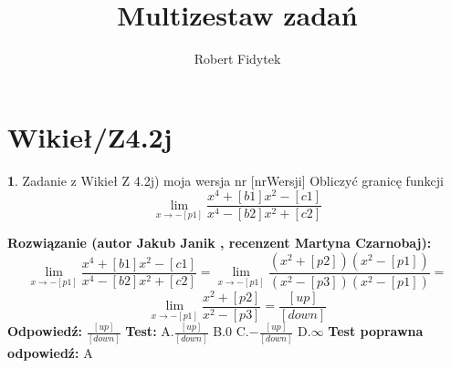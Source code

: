 \documentclass[12pt, a4paper]{article}
\title{Multizestaw zadań}
\author{Robert Fidytek}
\date{}
\theoremstyle{definition} %
\newtheorem{zad}{}
\newcommand{\kategoria}[1]{\section{#1}} %
\newcommand{\zadStart}[1]{\begin{zad}#1\newline} %
\newcommand{\zadStop}{\end{zad}}   %
\newcommand{\rozwStart}[2]{\noindent \textbf{Rozwiązanie (autor #1 , recenzent #2): }\newline} %
\newcommand{\rozwStop}{\newline}                                            %
\newcommand{\odpStart}{\noindent \textbf{Odpowiedź:}\newline}    %
\newcommand{\odpStop}{\newline}                                             %
\newcommand{\testStart}{\noindent \textbf{Test:}\newline} %
\newcommand{\testStop}{\newline} %
\newcommand{\kluczStart}{\noindent \textbf{Test poprawna odpowiedź:}\newline} %
\newcommand{\kluczStop}{\newline} %
\begin{document}
\maketitle


\kategoria{Wikieł/Z4.2j}
\zadStart{Zadanie z Wikieł Z 4.2j) moja wersja nr [nrWersji]}
Obliczyć granicę funkcji $$\lim_{x \to -[p1]} \frac{x^4+[b1]x^2-[c1]}{x^4-[b2]x^2+[c2]}$$
\zadStop
\rozwStart{Jakub Janik}{Martyna Czarnobaj}
$$\lim_{x \to -[p1]} \frac{x^4+[b1]x^2-[c1]}{x^4-[b2]x^2+[c2]}=\lim_{x \to -[p1]} \frac{(x^2+[p2])(x^2-[p1])}{(x^2-[p3])(x^2-[p1])}=$$
$$\lim_{x \to -[p1]} \frac{x^2+[p2]}{x^2-[p3]}=\frac{[up]}{[down]}$$
\rozwStop
\odpStart
$\frac{[up]}{[down]}$
\odpStop
\testStart
A.$\frac{[up]}{[down]}$
B.$0$
C.$-\frac{[up]}{[down]}$
D.$\infty$
\testStop
\kluczStart
A
\kluczStop
\end{document}
